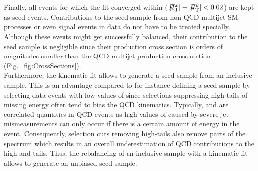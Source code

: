 Finally, all events for which the fit converged within ($|\slash\mkern-12mu{H}_{\text{T}}^x| + |\slash\mkern-12mu{H}_{\text{T}}^y| < 0.02$\gev) are kept as seed events. Contributions to the seed sample from non-QCD multijet SM processes or even signal events in data do not have to be treated specially. Although these events might get successfully balanced, their contribution to the seed sample is negligible since their production cross section is orders of magnitudes smaller than the QCD multijet production cross section (\cf Fig.~\ref{fig:CrossSections}). \\
Furthermore, the kinematic fit allows to generate a seed sample from an inclusive sample. This is an advantage compared to for instance defining a seed sample by selecting data events with low values of \MHT since selections suppressing high tails of missing energy often tend to bias the QCD kinematics. Typically, \HT and \MHT are correlated quantities in QCD events as high values of \MHT caused by severe jet mismeasurements can only occur if there is a certain amount of energy in the event. Consequently, selection cuts removing high-\MHT tails also remove parts of the \HT spectrum which results in an overall underestimation of QCD contributions to the high \HT and \MHT tails. Thus, the rebalancing of an inclusive sample with a kinematic fit allows to generate an unbiased seed sample.  

